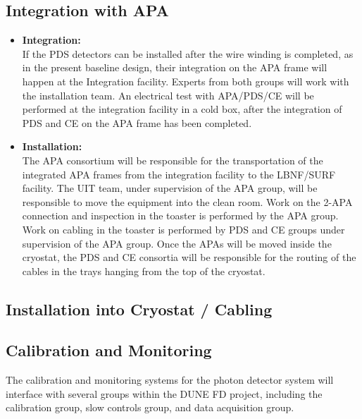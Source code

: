 \subsection{Integration with APA}

\begin{itemize}

\item \textbf{Integration:}\\
If the PDS detectors can be installed after the wire winding is completed, as in the present baseline design, their integration on the APA frame will happen at the Integration facility. Experts from both groups will work with the installation team. 
An electrical test with APA/PDS/CE will be performed at the integration facility in a cold box, after the integration of PDS and CE on the APA frame has been completed.


\item \textbf{Installation:}\\
The APA consortium will be responsible for the transportation of the integrated APA frames from the integration facility to the LBNF/SURF facility. 
The UIT team, under supervision of the APA group, will be responsible to move the equipment into the clean room. 
Work on the 2-APA connection and inspection in the toaster is performed by the APA group.
Work on cabling in the toaster is performed by PDS and CE groups under supervision of the APA group.
Once the APAs will be moved inside the cryostat, the PDS and CE consortia will be responsible for the routing of the cables in the trays hanging from the top of the cryostat. 

\end{itemize}

\subsection{Installation into Cryostat / Cabling}

\subsection{Calibration and Monitoring}

The calibration and monitoring systems for the photon detector system will interface with several groups within the DUNE FD project, including the calibration group, slow controls group, and data acquisition group.

